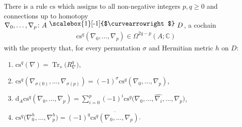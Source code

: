 \documentclass[pdftex]{sigma}
\numberwithin{equation}{section}
\newcommand{\homo}{ \ \raisebox{\depth}{\scalebox{1}[-1]{$\curvearrowright$}} \ }
\newcommand{\C}{\mathbb{C}}
\newcommand{\dd}{\mathrm{d}}
\newcommand{\8}{\infty}
\begin{document}
\begin{lemma*} There is a rule $\mathrm{cs}$ which assigns to all non-negative integers $p,q\geqslant 0$ and connections up to homotopy $\nabla_0,\dots ,\nabla_p\colon A \homo D$, a cochain
\begin{gather*}
 \mathrm{cs}^q(\nabla_0,\dots ,\nabla_p) \in \Omega^{2q-p}(A;\C)
\end{gather*}with the property that, for every permutation $\sigma$ and Hermitian metric $h$ on $D$:{\samepage
\begin{enumerate}\itemsep=0pt
 \item[$\mathrm{CS} 1)$] $\mathrm{cs}^q(\nabla)=\operatorname{Tr}_s\big(R_{\nabla}^q\big)$,
 \item[$\mathrm{CS} 2)$] $\mathrm{cs}^q(\nabla_{\sigma(0)},\dots ,\nabla_{\sigma (p)})=(-1)^{\sigma}\mathrm{cs}^q(\nabla_0,\dots ,\nabla_p)$,
 \item[$\mathrm{CS} 3)$] $\dd_A\mathrm{cs}^q(\nabla_0,\dots ,\nabla_p) = \sum\limits_{i=0}^p(-1)^i\mathrm{cs}^q\big(\nabla_0,\dots ,\widehat{\nabla_i},\dots ,\nabla_p\big)$,
 \item[$\mathrm{CS} 4)$] $\mathrm{cs}^q\big(\nabla_0^h,\dots ,\nabla_p^h\big) =(-1)^q\overline{\mathrm{cs}^q(\nabla_0,\dots ,\nabla_p)}$.
\end{enumerate}}
\end{lemma*}
\end{document}

